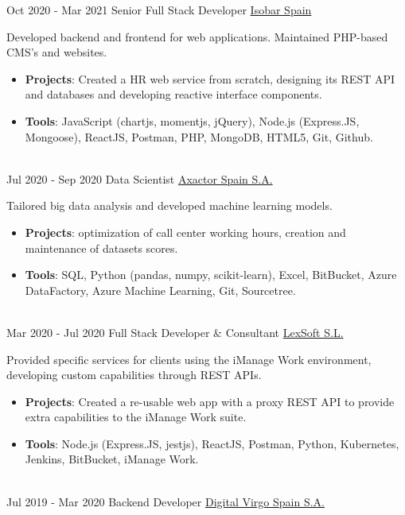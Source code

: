 \documentclass[letterpaper]{twentysecondcv} %
\begin{document}
\begin{twenty}
    \twentyitem
    	{Oct 2020 -}
		{Mar 2021}
        {Senior Full Stack Developer}
        {\href{https://www.isobar.com/es-es}{Isobar Spain}}
        {}
        {
        Developed backend and frontend for web applications. Maintained PHP-based CMS's and websites.
        \begin{itemize}
            \item \textbf{Projects}: Created a HR web service from scratch, designing its REST API and databases and developing reactive interface components.
            \item \textbf{Tools}: JavaScript (chartjs, momentjs, jQuery), Node.js (Express.JS, Mongoose), ReactJS, Postman, PHP, MongoDB, HTML5, Git, Github.
        \end{itemize}}
        \\
    \twentyitem
    	{Jul 2020 -}
		{Sep 2020}
        {Data Scientist}
        {\href{https://www.axactor.com/}{Axactor Spain S.A.}}
        {}
        {
        Tailored big data analysis and developed machine learning models.
        \begin{itemize}
            \item \textbf{Projects}: optimization of call center working hours, creation and maintenance of datasets scores.
            \item \textbf{Tools}: SQL, Python (pandas, numpy, scikit-learn), Excel, BitBucket, Azure DataFactory, Azure Machine Learning, Git, Sourcetree.
        \end{itemize}}
        \\
	\twentyitem
    	{Mar 2020 -}
		{Jul 2020}
        {Full Stack Developer \& Consultant}
        {\href{www.lex-soft.com}{LexSoft S.L.}}
        {}
        {
        {
        Provided specific services for clients using the iManage Work environment, developing custom capabilities through REST APIs.
        \begin{itemize}
            \item \textbf{Projects}: Created a re-usable web app with a proxy REST API to provide extra capabilities to the iManage Work suite.
            \item \textbf{Tools}: Node.js (Express.JS, jestjs), ReactJS, Postman, Python, Kubernetes, Jenkins, BitBucket, iManage Work. 
        \end{itemize}}
        }
    \\   
    \twentyitem
   		{Jul 2019 -}
		{Mar 2020}
        {Backend Developer}
        {\href{https://www.digitalvirgo.com/}{Digital Virgo Spain S.A.}}

\end{twenty}
\end{document}
